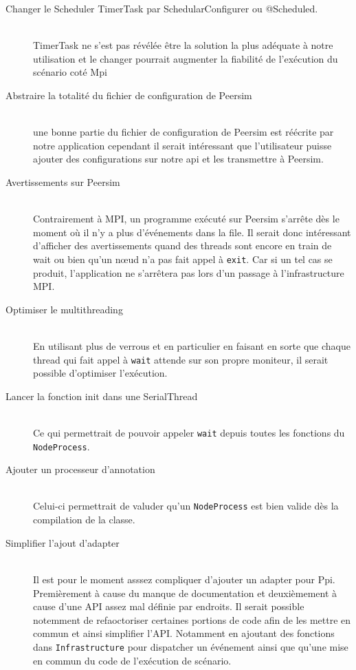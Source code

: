 \documentclass{article}
\begin{document}
			\begin{description}
				\item[Changer le Scheduler TimerTask par SchedularConfigurer ou @Scheduled.] \hfill \\ TimerTask ne s'est pas révélée être la solution la plus adéquate à notre utilisation et le changer pourrait augmenter la fiabilité de l'exécution du scénario coté Mpi
				\item[Abstraire la totalité du fichier de configuration de Peersim] \hfill \\ une bonne partie du fichier de configuration de Peersim est réécrite par notre application cependant il serait intéressant que l'utilisateur puisse ajouter des configurations sur notre api et les transmettre à Peersim.
				\item[Avertissements sur Peersim] \hfill \\
				Contrairement à MPI, un programme exécuté sur Peersim s'arrête dès le moment où il
				n'y a plus d'événements dans la file. Il serait donc intéressant d'afficher des
				avertissements quand des threads sont encore en train de wait ou bien qu'un n\oe ud
				n'a pas fait appel à \lstinline{exit}. Car si un tel cas se produit, l'application
				ne s'arrêtera pas lors d'un passage à l'infrastructure MPI.
				\item[Optimiser le multithreading] \hfill \\
				En utilisant plus de verrous et en particulier en faisant en sorte que chaque thread
				qui fait appel à \lstinline{wait} attende sur son propre moniteur, il serait possible
				d'optimiser l'exécution.
				\item[Lancer la fonction init dans une SerialThread] \hfill \\
				Ce qui permettrait de pouvoir appeler \lstinline{wait} depuis toutes les fonctions
				du \lstinline{NodeProcess}.
				\item[Ajouter un processeur d'annotation] \hfill \\
				Celui-ci permettrait de valuder qu'un \lstinline{NodeProcess} est bien valide dès
				la compilation de la classe.
				\item[Simplifier l'ajout d'adapter] \hfill \\
				Il est pour le moment asssez compliquer d'ajouter un adapter pour Ppi. Premièrement
				à cause du manque de documentation et deuxièmement à cause d'une API assez mal
				définie par endroits. Il serait possible notemment de refaoctoriser certaines
				portions de code afin de les mettre en commun et ainsi simplifier l'API.
				Notamment en ajoutant des fonctions dans \lstinline{Infrastructure} pour dispatcher
				un événement ainsi que qu'une mise en commun du code de l'exécution de scénario.
			\end{description}
		
\end{document}
